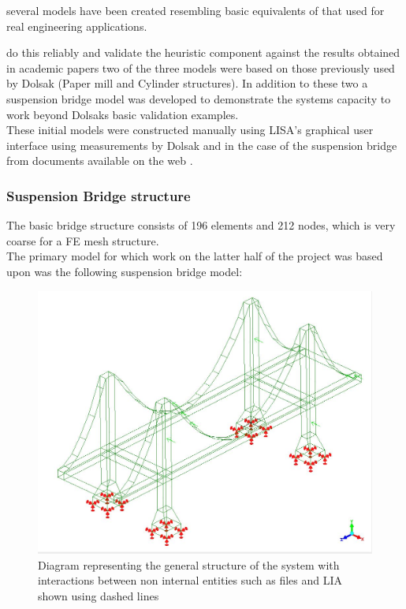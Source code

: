 
several models have been created resembling basic equivalents of that used for real engineering applications.

 do this reliably and validate the heuristic component against the results obtained in academic papers two of the three models were based on those previously used by Dolsak (Paper mill and Cylinder structures). In addition to these two a suspension bridge model was developed to demonstrate the systems capacity to work beyond Dolsaks basic validation examples. \\ 

\noindent
These initial models were constructed manually using LISA's graphical user interface using measurements by Dolsak and in the case of the suspension bridge from documents available on the web \cite{DolsakPaper91} \cite{SuspensionBridgeMeasurements}.

\subsubsection{Suspension Bridge structure}


\noindent
The basic bridge structure consists of 196 elements and 212 nodes, which is very coarse for a FE mesh structure. \\


\noindent
The primary model for which work on the latter half of the project was based upon was the following suspension bridge model:


\begin{figure}
  \centerline{\includegraphics[width=150mm, scale=1]{../Graphics/BasicBridge.jpeg}}
  \caption{Diagram representing the general structure of the system with interactions between non internal entities such as files and LIA shown using dashed lines}
  \label{fig:h-refinementImp}
\end{figure}


